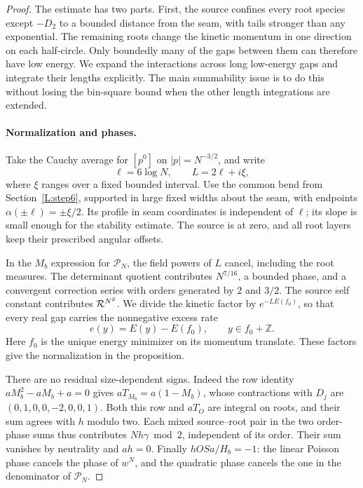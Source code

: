 \documentclass[11pt]{article}
\numberwithin{equation}{section}
\theoremstyle{definition}\newtheorem{definition}[theorem]{Definition}
\theoremstyle{remark}\newtheorem{remark}[theorem]{Remark}
\begin{document}
\begin{proof}
The estimate has two parts. First, the source confines every root species
except \(-D_2\) to a bounded distance from the seam, with tails stronger
than any exponential. The remaining roots change the kinetic momentum
in one direction on each half-circle. Only boundedly many of the gaps
between them can therefore have low energy. We expand the interactions
across long low-energy gaps and integrate their lengths explicitly. The
main summability issue is to do this without losing the bin-square bound
when the other length integrations are extended.

\paragraph{Normalization and phases.}
Take the Cauchy average for \([p^0]\) on \(|p|=N^{-3/2}\), and write
\[
 \ell=6\log N,\qquad L=2\ell+i\xi,
\]
where \(\xi\) ranges over a fixed bounded interval. Use the common bend
from Section~\ref{L:step6}, supported in large fixed widths about the
seam, with endpoints \(\alpha(\pm\ell)=\pm\xi/2\). Its profile in seam
coordinates is independent of \(\ell\); its slope is small enough for
the stability estimate. The source is at zero, and all root layers keep
their prescribed angular offsets.

In the \(M_b\) expression for \(\mathscr P_N\), the field powers of
\(L\) cancel, including the root measures. The determinant quotient
contributes \(N^{7/16}\), a bounded phase, and a convergent correction
series with orders generated by \(2\) and \(3/2\). The source self
constant contributes \({\cal R}^{N^2}\). We divide the kinetic factor
by \(e^{-L E(f_0)}\), so that every real gap carries the nonnegative
excess rate
\[
 e(y)=E(y)-E(f_0),\qquad y\in f_0+\mathbb Z.
\]
Here \(f_0\) is the unique energy minimizer on its momentum translate.
These factors give the normalization in the proposition.

There are no residual size-dependent signs. Indeed the row identity
\(aM_b^2-aM_b+a=0\) gives
\(aT_{M_b}=a(1-M_b)\), whose contractions with \(D_j\) are
\((0,1,0,0,-2,0,0,1)\). Both this row and \(aT_O\) are integral on
roots, and their sum agrees with \(h\) modulo two. Each mixed
source--root pair in the two order-phase sums thus contributes
\(Nh\gamma\bmod2\), independent of its order. Their sum vanishes by
neutrality and \(ah=0\). Finally \(hOSa/H_b=-1\): the linear Poisson
phase cancels the phase of \(w^N\), and the quadratic phase cancels the
one in the denominator of \(\mathscr P_N\).


\end{proof}
\end{document}
